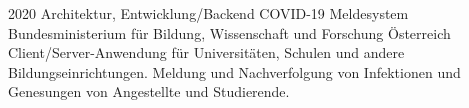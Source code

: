 \cventry
{2020}
{Architektur, Entwicklung/Backend}
{COVID-19 Meldesystem}
{Bundesministerium für Bildung, Wissenschaft und Forschung}
{Österreich}
{
  Client/Server-Anwendung für Universitäten, Schulen und andere
  Bildungseinrichtungen. Meldung und Nachverfolgung von Infektionen
  und Genesungen von Angestellte und Studierende.
}
